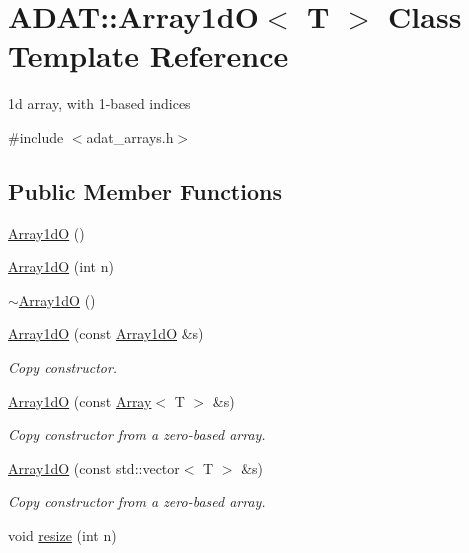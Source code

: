 \hypertarget{classADAT_1_1Array1dO}{}\section{A\+D\+AT\+:\+:Array1dO$<$ T $>$ Class Template Reference}
\label{classADAT_1_1Array1dO}


1d array, with 1-\/based indices  




{\ttfamily \#include $<$adat\+\_\+arrays.\+h$>$}

\subsection*{Public Member Functions}
\begin{DoxyCompactItemize}
\item 
\mbox{\hyperlink{classADAT_1_1Array1dO_af55d30db029bb654a123544dfc155e6a}{Array1dO}} ()
\item 
\mbox{\hyperlink{classADAT_1_1Array1dO_abd486987192b85b2cd27fd28660168bf}{Array1dO}} (int n)
\item 
\mbox{\hyperlink{classADAT_1_1Array1dO_a4abf4e2555ad2189b5000e323f0f99e8}{$\sim$\+Array1dO}} ()
\item 
\mbox{\hyperlink{classADAT_1_1Array1dO_abf14ebcf56d52421ff42141883440283}{Array1dO}} (const \mbox{\hyperlink{classADAT_1_1Array1dO}{Array1dO}} \&s)
\begin{DoxyCompactList}\small\item\em Copy constructor. \end{DoxyCompactList}\item 
\mbox{\hyperlink{classADAT_1_1Array1dO_adcc074ae1935a9371a950d1a99bfa3ec}{Array1dO}} (const \mbox{\hyperlink{classXMLArray_1_1Array}{Array}}$<$ T $>$ \&s)
\begin{DoxyCompactList}\small\item\em Copy constructor from a zero-\/based array. \end{DoxyCompactList}\item 
\mbox{\hyperlink{classADAT_1_1Array1dO_aad6c2df87d1dc941fd561fd74d181ddc}{Array1dO}} (const std\+::vector$<$ T $>$ \&s)
\begin{DoxyCompactList}\small\item\em Copy constructor from a zero-\/based array. \end{DoxyCompactList}\item 
void \mbox{\hyperlink{classADAT_1_1Array1dO_afc98b7076e43428faae90d7cb1dab3bf}{resize}} (int n)

\end{DoxyCompactItemize}

